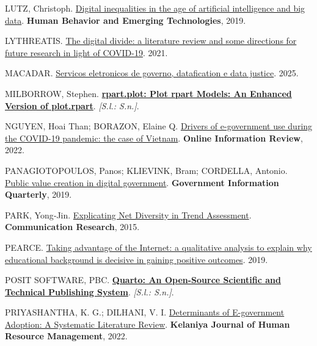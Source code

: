 \documentclass[
  man,
  floatsintext,
  longtable,
  a4paper,
  nolmodern,
  notxfonts,
  notimes,
  colorlinks=true,linkcolor=blue,citecolor=blue,urlcolor=blue]{apa7}
\newlength{\cslhangindent}
\newenvironment{CSLReferences}[2] %
 {\begin{list}{}{%
  \setlength{\itemindent}{0pt}
  \setlength{\leftmargin}{0pt}
  \setlength{\parsep}{0pt}
  \ifodd #1
   \setlength{\leftmargin}{\cslhangindent}
   \setlength{\itemindent}{-1\cslhangindent}
  \fi
  \setlength{\itemsep}{#2\baselineskip}}}
 {\end{list}}
\begin{document}
\begin{CSLReferences}{0}{1}
LUTZ, Christoph. \href{https://doi.org/10.1002/hbe2.140}{Digital
inequalities in the age of artificial intelligence and big data}.
\textbf{Human Behavior and Emerging Technologies}, 2019.

LYTHREATIS. \href{https://doi.org/10.1108/gkmc-06-2020-0075}{The digital
divide: a literature review and some directions for future research in
light of COVID-19}. 2021.

MACADAR. \href{https://doi.org/10.59490/dgo.2025.1002}{Servicos
eletronicos de governo, datafication e data justice}. 2025.

MILBORROW, Stephen.
\textbf{\href{http://www.milbo.org/rpart-plot/index.html}{rpart.plot:
Plot rpart Models: An Enhanced Version of plot.rpart}}. \emph{{[}S.l.:
S.n.{]}}.

NGUYEN, Hoai Than; BORAZON, Elaine Q.
\href{https://doi.org/10.1108/oir-08-2021-0440}{Drivers of e-government
use during the COVID-19 pandemic: the case of Vietnam}. \textbf{Online
Information Review}, 2022.

PANAGIOTOPOULOS, Panos; KLIEVINK, Bram; CORDELLA, Antonio.
\href{https://doi.org/10.1016/j.giq.2019.101421}{Public value creation
in digital government}. \textbf{Government Information Quarterly}, 2019.

PARK, Yong‐Jin.
\href{https://doi.org/10.1177/0093650215601883}{Explicating Net
Diversity in Trend Assessment}. \textbf{Communication Research}, 2015.

PEARCE. \href{https://doi.org/10.1016/j.poetic.2019.101426}{Taking
advantage of the Internet: a qualitative analysis to explain why
educational background is decisive in gaining positive outcomes}. 2019.

POSIT SOFTWARE, PBC. \textbf{\href{https://quarto.org}{Quarto: An
Open-Source Scientific and Technical Publishing System}}. \emph{{[}S.l.:
S.n.{]}}.

PRIYASHANTHA, K. G.; DILHANI, V. I.
\href{https://doi.org/10.4038/kjhrm.v17i1.107}{Determinants of
E-government Adoption: A Systematic Literature Review}. \textbf{Kelaniya
Journal of Human Resource Management}, 2022.


\end{CSLReferences}
\end{document}
